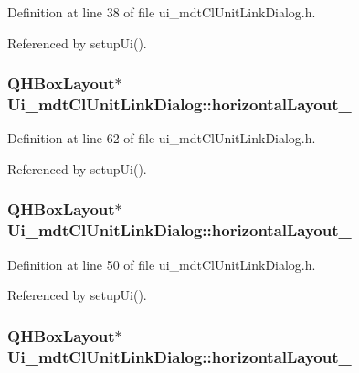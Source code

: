 Definition at line 38 of file ui\-\_\-mdt\-Cl\-Unit\-Link\-Dialog.\-h.



Referenced by setup\-Ui().

\hypertarget{class_ui__mdt_cl_unit_link_dialog_ad1e38f2bd431aec80de9fee9903c447a}{
\subsubsection[{horizontal\-Layout\-\_\-2}]{\setlength{\rightskip}{0pt plus 5cm}Q\-H\-Box\-Layout$\ast$ Ui\-\_\-mdt\-Cl\-Unit\-Link\-Dialog\-::horizontal\-Layout\-\_}}\label{class_ui__mdt_cl_unit_link_dialog_ad1e38f2bd431aec80de9fee9903c447a}


Definition at line 62 of file ui\-\_\-mdt\-Cl\-Unit\-Link\-Dialog.\-h.



Referenced by setup\-Ui().

\hypertarget{class_ui__mdt_cl_unit_link_dialog_a411e59c409336545507273a988f433b6}{
\subsubsection[{horizontal\-Layout\-\_\-3}]{\setlength{\rightskip}{0pt plus 5cm}Q\-H\-Box\-Layout$\ast$ Ui\-\_\-mdt\-Cl\-Unit\-Link\-Dialog\-::horizontal\-Layout\-\_}}\label{class_ui__mdt_cl_unit_link_dialog_a411e59c409336545507273a988f433b6}


Definition at line 50 of file ui\-\_\-mdt\-Cl\-Unit\-Link\-Dialog.\-h.



Referenced by setup\-Ui().

\hypertarget{class_ui__mdt_cl_unit_link_dialog_a83f86965ec189685c8fa610371be4cdf}{
\subsubsection[{horizontal\-Layout\-\_\-4}]{\setlength{\rightskip}{0pt plus 5cm}Q\-H\-Box\-Layout$\ast$ Ui\-\_\-mdt\-Cl\-Unit\-Link\-Dialog\-::horizontal\-Layout\-\_}}\label{class_ui__mdt_cl_unit_link_dialog_a83f86965ec189685c8fa610371be4cdf}


